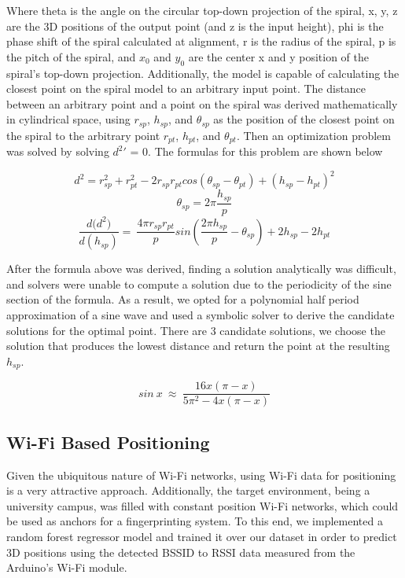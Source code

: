 Where theta is the angle on the circular top-down projection of the spiral, x, y, z are the 3D positions of the output point (and z is the input height), phi is the phase shift of the spiral calculated at alignment, r is the radius of the spiral, p is the pitch of the spiral, and $x_0$ and $y_0$ are the center x and y position of the spiral's top-down projection.
Additionally, the model is capable of calculating the closest point on the spiral model to an arbitrary input point. The distance between an arbitrary point and a point on the spiral was derived mathematically in cylindrical space, using $r_{sp}$, $h_{sp}$, and $\theta_{sp}$ as the position of the closest point on the spiral to the arbitrary point $r_{pt}$, $h_{pt}$, and $\theta_{pt}$. Then an optimization problem was solved by solving $d^2\prime$ = 0. The formulas for this problem are shown below

$$d^2=r_{sp}^2+r_{pt}^2-2r_{sp}r_{pt}cos\left(\theta_{sp}-\theta_{pt}\right)+\left(h_{sp}-h_{pt}\right)^2$$
$$\theta_{sp}=2\pi\frac{h_{sp}}{p}$$
$$\frac{{d(d}^2)}{d(h_{sp})}=\ \frac{4\pi r_{sp}r_{pt}}{p}sin(\frac{2\pi h_{sp}}{p}-\theta_{sp})+2h_{sp}-2h_{pt}$$

After the formula above was derived, finding a solution analytically was difficult, and solvers were unable to compute a solution due to the periodicity of the sine section of the formula. As a result, we opted for a polynomial half period approximation of a sine wave  and used a symbolic solver to derive the candidate solutions for the optimal point. There are 3 candidate solutions, we choose the solution that produces the lowest distance and return the point at the resulting $h_{sp}$. 

$$sin\ x\ \approx\ \frac{16x(\pi-x)}{5\pi^2-4x(\pi-x)}$$

\subsection{Wi-Fi Based Positioning}
Given the ubiquitous nature of Wi-Fi networks, using Wi-Fi data for positioning is a very attractive approach. Additionally, the target environment, being a university campus, was filled with constant position Wi-Fi networks, which could be used as anchors for a fingerprinting system. To this end, we implemented a random forest regressor model and trained it over our dataset in order to predict 3D positions using the detected BSSID to RSSI data measured from the Arduino's Wi-Fi module. \cite{pedregosa_2011_scikitlearn}
\par

